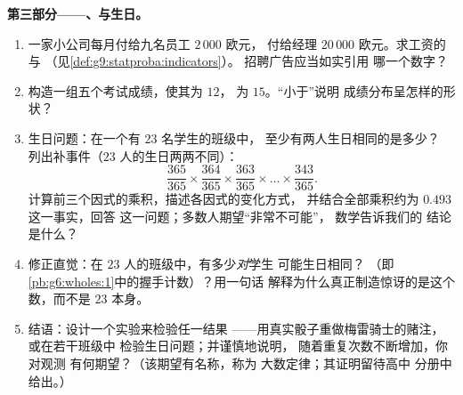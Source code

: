 \begin{problem}
\medskip
\noindent\textbf{第三部分——、与生日。}
\begin{enumerate}[resume]
  \item 一家小公司每月付给九名员工 $2\,000$ 欧元，
        付给经理 $20\,000$ 欧元。求工资的与
        （见\cref{def:g9:statproba:indicators}）。
        招聘广告应当如实引用
        哪一个数字？
  \item 构造一组五个考试成绩，使其为 $12$，
        为 $15$。“小于”说明
        成绩分布呈怎样的形状？
  \item 生日问题：在一个有 $23$ 名学生的班级中，
        至少有两人生日相同的是多少？
        列出补事件（$23$ 人的生日两两不同）：
        \[
        \frac{365}{365} \times \frac{364}{365} \times
        \frac{363}{365} \times \dots \times \frac{343}{365} .
        \]
        计算前三个因式的乘积，描述各因式的变化方式，
        并结合全部乘积约为 $0.493$ 这一事实，回答
        这一问题；多数人期望“非常不可能”，
        数学告诉我们的
        结论是什么？
  \item 修正直觉：在 $23$ 人的班级中，有多少\emph{对}学生
        可能生日相同？
        （即\cref{pb:g6:wholes:1}中的握手计数）？用一句话
        解释为什么真正制造惊讶的是这个数，而不是
        $23$ 本身。
  \item 结语：设计一个实验来检验任一结果
        ——用真实骰子重做梅雷骑士的赌注，或在若干班级中
        检验生日问题；并谨慎地说明，
        随着重复次数不断增加，你对观测
        有何期望？（该期望有名称，称为
        大数定律；其证明留待高中
        分册中给出。）
\end{enumerate}
\end{problem}
